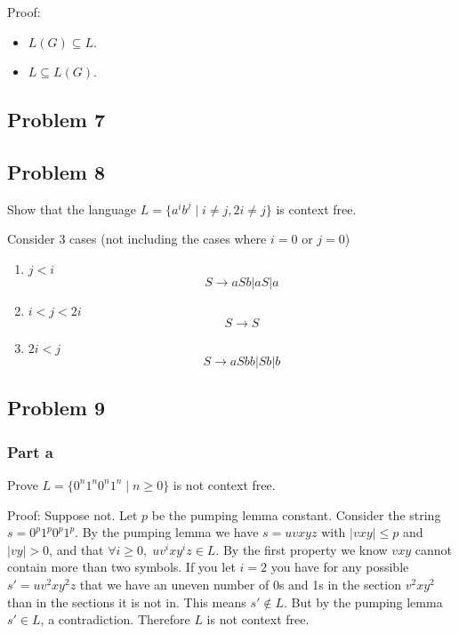 \documentclass[english]{article}
\begin{document}
Proof:
\begin{itemize}
\item \(L(G) \subseteq L\). 
\item \(L \subseteq L(G)\). 
\end{itemize}

\subsection*{Problem 7}

\subsection*{Problem 8}
Show that the language \(L = \{a^i b^j \mid i \neq j, 2i \neq j\}\) is context free.

Consider 3 cases (not including the cases where $i=0$ or $j=0$)
\begin{enumerate}
\item \(j < i\)
\[ S \rightarrow aSb | aS | a \]

\item \(i < j < 2i\)
\[ S \rightarrow  S \] %

\item \(2i < j\)
\[ S \rightarrow aSbb | Sb | b \]

\end{enumerate}

\subsection*{Problem 9}
\subsubsection*{Part a}
Prove \(L = \{0^n 1^n 0^n 1^n \mid n \ge 0\}\) is not context free.

Proof: Suppose not. Let $p$ be the pumping lemma constant. Consider the string $s = 0^p 1^p 0^p 1^p$. By the pumping lemma
we have $s = uvxyz$ with $|vxy| \le p$ and $|vy| > 0$, and that \(\forall i \ge 0,\; uv^ixy^iz \in L\). By the first property
we know $vxy$ cannot contain more than two symbols. If you let $i=2$ you have for any possible $s' = uv^2xy^2z$ that we have
an uneven number of 0s and 1s in the section $v^2xy^2$ than in the sections it is not in. This means $s' \notin L$.
But by the pumping lemma $s' \in L$, a contradiction. Therefore $L$ is not context free.
\end{document}

